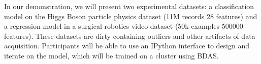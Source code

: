 In our demonstration, we will present two experimental datasets: a classification model on the Higgs Boson particle physics dataset (11M records 28 features) and a regression model in a surgical robotics video dataset (50k examples 500000 features).
These datasets are dirty containing outliers and other artifacts of data acquisition.
Participants will be able to use an IPython interface to design and iterate on the model, which will be trained on a cluster using BDAS.
 









